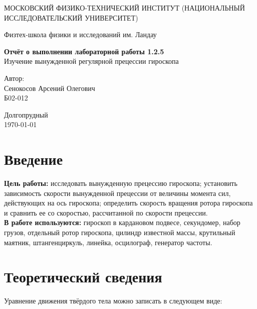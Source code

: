 \documentclass[a4paper,12pt]{article} %
\date{\today}
\begin{document}
\begin{titlepage}
	\begin{center}
		{\large МОСКОВСКИЙ ФИЗИКО-ТЕХНИЧЕСКИЙ ИНСТИТУТ (НАЦИОНАЛЬНЫЙ ИССЛЕДОВАТЕЛЬСКИЙ УНИВЕРСИТЕТ)}
	\end{center}
	\begin{center}
		{\large Физтех-школа физики и исследований им. Ландау}
	\end{center}
	
	
	\vspace{4.5cm}
	{\huge
		\begin{center}
			{\bf Отчёт о выполнении лабораторной работы 1.2.5}\\
			Изучение вынужденной регулярной прецессии гироскопа
		\end{center}
	}
	\vspace{2cm}
	\begin{flushright}
		{\LARGE Автор:\\ Сенокосов Арсений Олегович \\
			\vspace{0.2cm}
			Б02-012}
	\end{flushright}
	\vspace{8cm}
	\begin{center}
		Долгопрудный\\
		\today
	\end{center}
\end{titlepage}

\section{Введение}

\textbf{Цель работы:} исследовать вынужденную прецессию гироскопа; установить зависимость скорости вынужденной прецессии от величины момента сил, действующих на ось гироскопа; определить скорость вращения ротора гироскопа и сравнить ее со скоростью, рассчитанной по скорости прецессии.\\
\textbf{В работе используются:} гироскоп в кардановом подвесе, секундомер, набор грузов, отдельный ротор гироскопа, цилиндр известной массы, крутильный маятник, штангенциркуль, линейка, осцилограф, генератор частоты.

\section{Теоретический сведения}

Уравнение движения твёрдого тела можно записать в следующем виде:
\end{document}
